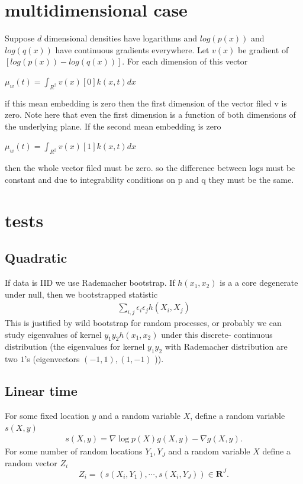 \documentclass{article}
\begin{document}
\section{multidimensional case}
Suppose $d$ dimensional densities have logarithms and  $log(p(x))$ and $log(q(x))$ have continuous  gradients everywhere. 
Let $v(x)$ be gradient of  $[ log(p(x)) - log(q(x)) ]$. For each dimension of this vector  

$\mu_w(t) = \int_{R^2}  v(x)[0] k(x,t) dx$
 
if this mean embedding is zero then the first dimension of the vector filed v is zero. Note here that even the first dimension is a function of both dimensions of the underlying plane. If the second  mean embedding is zero

$\mu_w(t) = \int_{R^2}  v(x)[1] k(x,t) dx$

then the whole vector filed must be zero. so the difference between logs must be constant and due to integrability conditions on p and q they must be the same.

\section{tests}

\subsection{Quadratic}
If data is IID we use Rademacher bootstrap. If $h(x_1,x_2)$ is a a core degenerate under null, then we bootstrapped statistic
\begin{align}
 \sum_{i,j} \epsilon_i \epsilon_j h(X_i,X_j)
\end{align}
This is justified by wild bootstrap for random processes, or probably we can study eigenvalues of kernel $y_1  y_2 h(x_1,x_2)$ under this discrete- continuous distribution  (the eigenvalues for kernel $y_1  y_2$ with Rademacher distribution are two $1$'s (eigenvectors $(-1,1),(1,-1)$ )).       


\subsection{Linear time}

For some fixed location $y$ and a random variable $X$, define a random variable $s(X,y)$
\begin{align}
 s(X,y) = \nabla \log p(X) g(X,y) -  \nabla g(X,y).
\end{align}
For some number of random locations $Y_1,Y_J$ and a random variable $X$ define a random vector $Z_i$
\begin{equation}
 Z_i = ( s(X_i,Y_1) , \cdots, s(X_i,Y_J)  )\in \mathbf R^J.
\end{equation}
\end{document}
